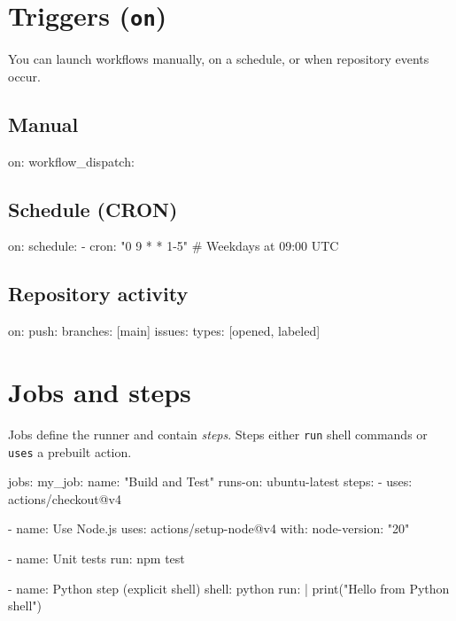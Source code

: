 \documentclass[11pt]{article}
\begin{document}
\section{Triggers (\texttt{on})}
You can launch workflows manually, on a schedule, or when repository events occur.
\subsection*{Manual}
\begin{yamlcode}
on:
  workflow_dispatch: {}
\end{yamlcode}

\subsection*{Schedule (CRON)}
\begin{yamlcode}
on:
  schedule:
    - cron: "0 9 * * 1-5"  # Weekdays at 09:00 UTC
\end{yamlcode}

\subsection*{Repository activity}
\begin{yamlcode}
on:
  push:
    branches: [main]
  issues:
    types: [opened, labeled]
\end{yamlcode}

\section{Jobs and steps}
Jobs define the runner and contain \emph{steps}. Steps either \verb|run| shell commands or \verb|uses| a prebuilt action.
\begin{yamlcode}
jobs:
  my_job:
    name: "Build and Test"
    runs-on: ubuntu-latest
    steps:
      - uses: actions/checkout@v4

      - name: Use Node.js
        uses: actions/setup-node@v4
        with:
          node-version: "20"

      - name: Unit tests
        run: npm test

      - name: Python step (explicit shell)
        shell: python
        run: |
          print("Hello from Python shell")
\end{yamlcode}
\clearpage
\end{document}
